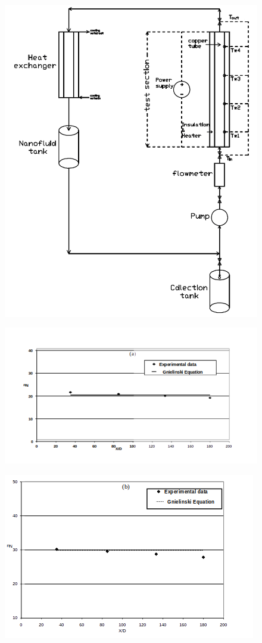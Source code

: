 \documentclass{article}
\begin{document}
\begin{figure}
	\centering
	\includegraphics[width=0.9\linewidth]{fig1}
	\caption{}
	\label{fig:fig1}
\end{figure}

\begin{figure}
	\centering
	\includegraphics[width=0.8\linewidth]{fig2}
	\caption{}
	\label{fig:fig2}
\end{figure}

\begin{figure}
	\centering
	\includegraphics[width=0.8\linewidth]{fig3}
	\caption{}
	\label{fig:fig3}
\end{figure}
\end{document}
